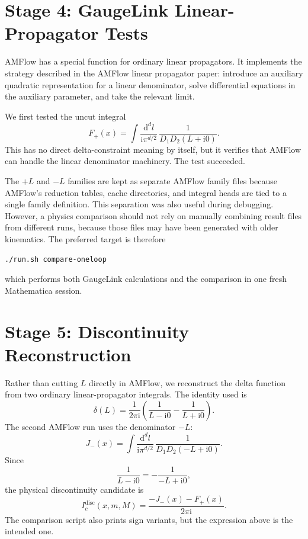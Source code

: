 \documentclass[11pt]{article}
\newcommand{\dd}{\mathrm{d}}
\newcommand{\ii}{\mathrm{i}}
\newcommand{\WL}[1]{\texttt{\detokenize{#1}}}
\begin{document}
\section{Stage 4: GaugeLink Linear-Propagator Tests}

AMFlow has a special function \WL{SolveIntegralsGaugeLink} for ordinary
linear propagators. It implements the strategy described in the AMFlow linear
propagator paper: introduce an auxiliary quadratic representation for a linear
denominator, solve differential equations in the auxiliary parameter, and take
the relevant limit.

We first tested the uncut integral
\begin{equation}
  F_+(x)
  =
  \int \frac{\dd^d l}{\ii \pi^{d/2}}\,
  \frac{1}{D_1D_2(L+\ii0)}.
\end{equation}
This has no direct delta-constraint meaning by itself, but it verifies that
AMFlow can handle the linear denominator machinery. The test succeeded.

The \(+L\) and \(-L\) families are kept as separate AMFlow family files because
AMFlow's reduction tables, cache directories, and integral heads are tied to a
single family definition. This separation was also useful during debugging.
However, a physics comparison should not rely on manually combining result
files from different runs, because those files may have been generated with
older kinematics. The preferred target is therefore
\begin{verbatim}
./run.sh compare-oneloop
\end{verbatim}
which performs both GaugeLink calculations and the comparison in one fresh
Mathematica session.

\section{Stage 5: Discontinuity Reconstruction}

Rather than cutting \(L\) directly in AMFlow, we reconstruct the delta function
from two ordinary linear-propagator integrals. The identity used is
\begin{equation}
  \delta(L)
  =
  \frac{1}{2\pi \ii}
  \left(
    \frac{1}{L-\ii0}
    -
    \frac{1}{L+\ii0}
  \right).
\end{equation}
The second AMFlow run uses the denominator \(-L\):
\begin{equation}
  J_-(x)
  =
  \int \frac{\dd^d l}{\ii \pi^{d/2}}\,
  \frac{1}{D_1D_2(-L+\ii0)}.
\end{equation}
Since
\begin{equation}
  \frac{1}{L-\ii0}=-\frac{1}{-L+\ii0},
\end{equation}
the physical discontinuity candidate is
\begin{equation}
  I_c^{\mathrm{disc}}(x,m,M)
  =
  \frac{-J_-(x)-F_+(x)}{2\pi\ii}.
\end{equation}
The comparison script also prints sign variants, but the expression above is
the intended one.
\end{document}
